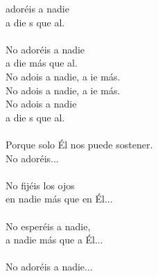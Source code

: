 \begin{cancion}%
	 adoréis a nadie\\
	a die s que al. \\
	\jump\\
No adoréis a nadie\\
	a die más que al.\\
	No adois a nadie, a ie más. \\
	No adois a nadie, a ie más. \\
	No adois a nadie \\
	a die s que al. \\
	\jump\\
Porque solo Él nos puede sostener.\\
No adoréis...\\
	\jump\\
No fijéis los ojos\\
en nadie más que en Él...\\
	\jump\\
No esperéis a nadie,\\
a nadie más que a Él...\\
	\jump\\
No adoréis a nadie...\\
\end{cancion}%
